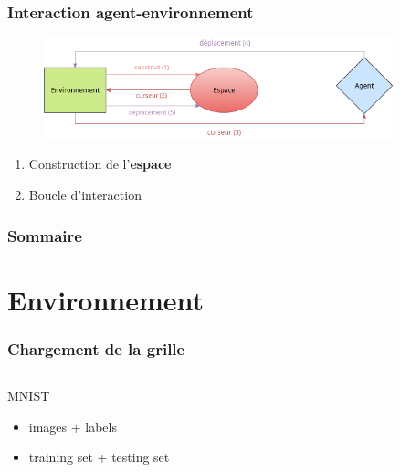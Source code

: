 \documentclass{beamer}
\begin{document}
\begin{frame}
    \frametitle{Interaction agent-environnement}
    \center
    \begin{figure}
        \includegraphics[width=0.9\textwidth]{agent_env_loop.png}
    \end{figure}
    \vspace{3em}
    \begin{enumerate}
        \item Construction de l'\textbf{espace}
        \item Boucle d'interaction
    \end{enumerate}
\end{frame}

\begin{frame}
    \frametitle{Sommaire}
    \tableofcontents
\end{frame}

\section{Environnement}

\begin{frame}
    \frametitle{Chargement de la grille}
    \begin{columns}[c]
        \begin{column}{.48\textwidth}
            \begin{block}{MNIST}
                \begin{itemize}
                    \item images + labels
                    \item training set + testing set
                \end{itemize}
            \end{block}
        \end{column}
    \end{columns}
\end{frame}
\end{document}

